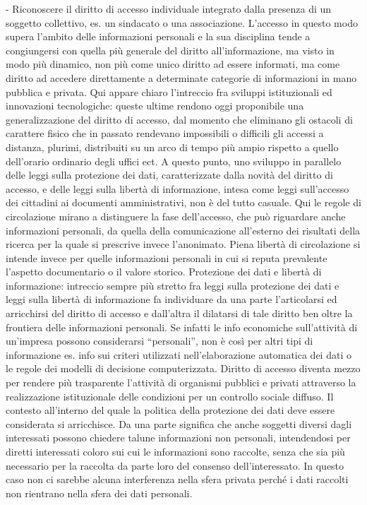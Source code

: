 -	Riconoscere il diritto di accesso individuale integrato dalla presenza di un soggetto collettivo, es. un sindacato o una associazione. 
L’accesso in questo modo supera l’ambito delle informazioni personali e la sua disciplina tende a congiungersi con quella più generale del diritto all’informazione, ma visto in modo più dinamico, non più come unico diritto ad essere informati, ma come diritto ad accedere direttamente a determinate categorie di informazioni in mano pubblica e privata. Qui appare chiaro l’intreccio fra sviluppi istituzionali ed innovazioni tecnologiche: queste ultime rendono oggi proponibile una generalizzazione del diritto di accesso, dal momento che eliminano gli ostacoli di carattere fisico che in passato rendevano impossibili o difficili gli accessi a distanza, plurimi, distribuiti su un arco di tempo più ampio rispetto a quello dell’orario ordinario degli uffici ect.
A questo punto, uno sviluppo in parallelo delle leggi sulla protezione dei dati, caratterizzate dalla novità del diritto di accesso, e delle leggi sulla libertà di informazione, intesa come leggi sull’accesso dei cittadini ai documenti amministrativi, non è del tutto casuale.
Qui le regole di circolazione mirano a distinguere la fase dell’accesso, che può riguardare anche informazioni personali, da quella della comunicazione all’esterno dei risultati della ricerca per la quale si prescrive invece l’anonimato.
Piena libertà di circolazione si intende invece per quelle informazioni personali in cui si reputa prevalente l’aspetto documentario o il valore storico.
Protezione dei dati e libertà di informazione:
intreccio sempre più stretto fra leggi sulla protezione dei dati e leggi sulla libertà di informazione fa individuare da una parte l’articolarsi ed arricchirsi del diritto di accesso e dall’altra il dilatarsi di tale diritto ben oltre la frontiera delle informazioni personali. Se infatti le info economiche sull’attività di un’impresa possono considerarsi “personali”, non è così per altri tipi di informazione es. info sui criteri utilizzati nell’elaborazione automatica dei dati o le regole dei modelli di decisione computerizzata. Diritto di accesso diventa mezzo per rendere più trasparente l’attività di organismi pubblici e privati attraverso la realizzazione istituzionale delle condizioni per un controllo sociale diffuso. 
Il contesto all’interno del quale la politica della protezione dei dati deve essere considerata si arricchisce.
Da una parte significa che anche soggetti diversi dagli interessati possono chiedere talune informazioni non personali, intendendosi per diretti interessati coloro sui cui le informazioni sono raccolte, senza che sia più necessario per la raccolta da parte loro del consenso dell’interessato. In questo caso non ci sarebbe alcuna interferenza nella sfera privata perché i dati raccolti non rientrano nella sfera dei dati personali.
